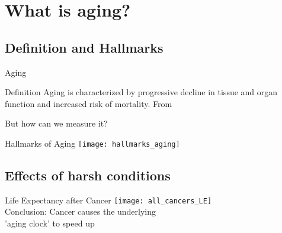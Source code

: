 \section{What is aging?}


\subsection{Definition and Hallmarks}

\begin{frame}[c]{Aging}
    \large

    \begin{block}{Definition}
        Aging is characterized by progressive decline in tissue and organ
        function and increased risk of mortality. From \cite{sen2016epigenetic}
    \end{block}
    \pause
    But how can we measure it?
\end{frame}


\begin{frame}[c]{Hallmarks of Aging}
    \texttt{[image: hallmarks\_aging]} \\
    \cite{lopez2013hallmarks}
\end{frame}


\subsection{Effects of harsh conditions}

\begin{frame}[c]{Life Expectancy after Cancer}
    \large
    \texttt{[image: all\_cancers\_LE]} \\
    \cite{botta2019changes}
    \newline
    \newline
    \pause
    Conclusion: Cancer causes the underlying \\ 'aging clock' to speed up
\end{frame}

